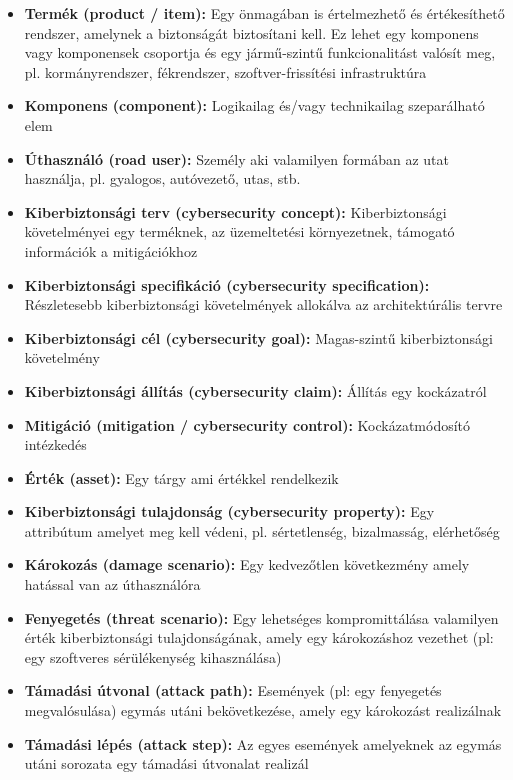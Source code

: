 \begin{itemize}
    \item \textbf{Termék (product / item):} Egy önmagában is értelmezhető és értékesíthető rendszer, amelynek a biztonságát biztosítani kell. Ez lehet egy komponens vagy komponensek csoportja és egy jármű-szintű funkcionalitást valósít meg, pl. kormányrendszer, fékrendszer, szoftver-frissítési infrastruktúra
    \item \textbf{Komponens (component):} Logikailag és/vagy technikailag szeparálható elem    
    \item \textbf{Úthasználó (road user):} Személy aki valamilyen formában az utat használja, pl. gyalogos, autóvezető, utas, stb.
    \item \textbf{Kiberbiztonsági terv (cybersecurity concept):} Kiberbiztonsági követelményei egy terméknek, az üzemeltetési környezetnek, támogató információk a mitigációkhoz
    \item \textbf{Kiberbiztonsági specifikáció (cybersecurity specification):} Részletesebb kiberbiztonsági követelmények allokálva az architektúrális tervre
    \item \textbf{Kiberbiztonsági cél (cybersecurity goal):} Magas-szintű kiberbiztonsági követelmény
    \item \textbf{Kiberbiztonsági állítás (cybersecurity claim):} Állítás egy kockázatról
    \item \textbf{Mitigáció (mitigation / cybersecurity control):} Kockázatmódosító intézkedés
    \item \textbf{Érték (asset):} Egy tárgy ami értékkel rendelkezik
    \item \textbf{Kiberbiztonsági tulajdonság (cybersecurity property):} Egy attribútum amelyet meg kell védeni, pl. sértetlenség, bizalmasság, elérhetőség
    \item \textbf{Károkozás (damage scenario):} Egy kedvezőtlen következmény amely hatással van az úthasználóra
    \item \textbf{Fenyegetés (threat scenario):} Egy lehetséges kompromittálása valamilyen érték kiberbiztonsági tulajdonságának, amely egy károkozáshoz vezethet (pl: egy szoftveres sérülékenység kihasználása)
    \item \textbf{Támadási útvonal (attack path):} Események (pl: egy fenyegetés megvalósulása) egymás utáni bekövetkezése, amely egy károkozást realizálnak
    \item \textbf{Támadási lépés (attack step):} Az egyes események amelyeknek az egymás utáni sorozata egy támadási útvonalat realizál
\end{itemize}

